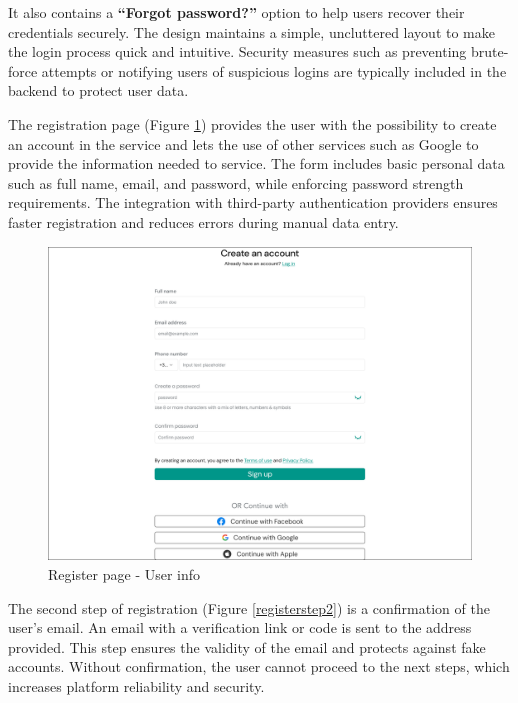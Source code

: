 It also contains a \textbf{``Forgot password?''} option to help users recover their credentials securely. 
The design maintains a simple, uncluttered layout to make the login process quick and intuitive. 
Security measures such as preventing brute-force attempts or notifying users of suspicious logins are typically included in the backend to protect user data.

The registration page (Figure \ref{register}) provides the user with the possibility to create an account in the service and lets the use of other services such as Google to provide the information needed to service. 
The form includes basic personal data such as full name, email, and password, while enforcing password strength requirements. 
The integration with third-party authentication providers ensures faster registration and reduces errors during manual data entry.

\begin{figure}[H]
    \centering
    \includegraphics[width=18cm]{"images/figmaUI/register1-crop.png"}
    \caption{Register page - User info}
    \label{register}
\end{figure}

The second step of registration (Figure \ref{registerstep2}) is a confirmation of the user's email. 
An email with a verification link or code is sent to the address provided. 
This step ensures the validity of the email and protects against fake accounts. 
Without confirmation, the user cannot proceed to the next steps, which increases platform reliability and security. 

